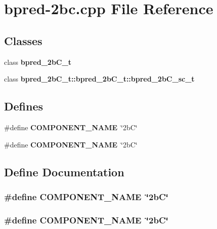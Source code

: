 \section{bpred-2bc.cpp File Reference}
\label{bpred-2bc_8cpp}
\subsection*{Classes}
\begin{CompactItemize}
\item 
class {\bf bpred\_\-2bC\_\-t}
\item 
class {\bf bpred\_\-2bC\_\-t::bpred\_\-2bC\_\-t::bpred\_\-2bC\_\-sc\_\-t}
\end{CompactItemize}
\subsection*{Defines}
\begin{CompactItemize}
\item 
\#define {\bf COMPONENT\_\-NAME}~\char`\"{}2bC\char`\"{}
\item 
\#define {\bf COMPONENT\_\-NAME}~\char`\"{}2bC\char`\"{}
\end{CompactItemize}


\subsection{Define Documentation}
\subsubsection[{COMPONENT\_\-NAME}]{\setlength{\rightskip}{0pt plus 5cm}\#define COMPONENT\_\-NAME~\char`\"{}2bC\char`\"{}}\label{zesto-bpred_8cpp_9146ade7ce24e3db226a973a59063892}


\subsubsection[{COMPONENT\_\-NAME}]{\setlength{\rightskip}{0pt plus 5cm}\#define COMPONENT\_\-NAME~\char`\"{}2bC\char`\"{}}\label{bpred-2bc_8cpp_9146ade7ce24e3db226a973a59063892}




